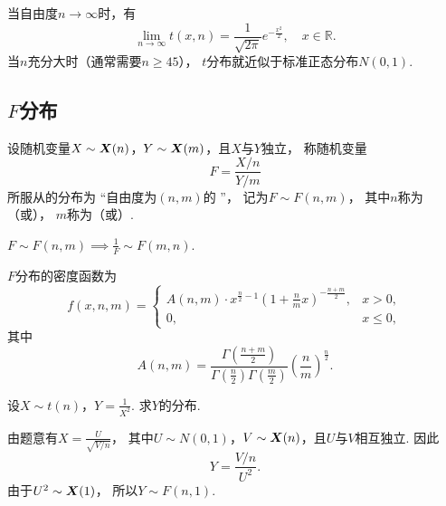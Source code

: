 当自由度\(n\to\infty\)时，有\[
	\lim_{n\to\infty} t(x,n) = \frac{1}{\sqrt{2\pi}} e^{-\frac{x^2}{2}},
	\quad x \in \mathbb{R}.
\]
当\(n\)充分大时（通常需要\(n \geq 45\)），
\(t\)分布就近似于标准正态分布\(N(0,1)\).

\subsection{\texorpdfstring{\(F\)}{F}分布}
\begin{definition}
设随机变量\(X \sim \boldsymbol{X}(n)\)，\(Y \sim \boldsymbol{X}(m)\)，且\(X\)与\(Y\)独立，
称随机变量\begin{equation}
	F=\frac{X/n}{Y/m}
\end{equation}
所服从的分布为
“自由度为\((n,m)\)的 ”，
记为\(F \sim F(n,m)\)，
其中\(n\)称为（或），
\(m\)称为（或）.
\end{definition}

\begin{proposition}
\(F \sim F(n,m) \implies \frac{1}{F} \sim F(m,n)\).
\end{proposition}

\begin{theorem}
\(F\)分布的密度函数为\begin{equation}
	f(x,n,m) = \left\{ \begin{array}{cl}
		A(n,m) \cdot x^{\frac{n}{2}-1}
		\left(1+\frac{n}{m}x\right)^{-\frac{n+m}{2}},
		& x > 0, \\
		0, & x \leq 0,
	\end{array} \right.
\end{equation}
其中\[
	A(n,m)=\frac{
		\Gamma\left(\frac{n+m}{2}\right)
	}{
		\Gamma\left(\frac{n}{2}\right) \Gamma\left(\frac{m}{2}\right)
	}
	\left(\frac{n}{m}\right)^{\frac{n}{2}}.
\]
\end{theorem}

\begin{example}
设\(X \sim t(n)\)，\(Y=\frac{1}{X^2}\).
求\(Y\)的分布.
\begin{solution}
由题意有\(X = \frac{U}{\sqrt{V/n}}\)，
其中\(U \sim N(0,1)\)，\(V \sim \boldsymbol{X}(n)\)，且\(U\)与\(V\)相互独立.
因此\[
	Y = \frac{V/n}{U^2}.
\]
由于\(U^2 \sim \boldsymbol{X}(1)\)，
所以\(Y \sim F(n,1)\).
\end{solution}
\end{example}
